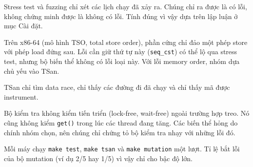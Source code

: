 \label{sec:corr:limits}

Stress test và fuzzing chỉ xét các lịch chạy đã xảy ra. Chúng chỉ ra được là có lỗi, không chứng minh
được là không có lỗi. Tính đúng vì vậy dựa trên lập luận ở mục Cài đặt.

Trên x86-64 (mô hình TSO, total store order), phần cứng chỉ đảo một phép store với phép load đứng sau.
Lỗi cần giữ thứ tự này (\texttt{seq\_cst}) có thể lộ qua stress test, nhưng bộ biến thể không có lỗi
loại này. Với lỗi memory order, nhóm dựa chủ yếu vào TSan.

TSan chỉ tìm data race, chỉ thấy các đường đi đã chạy và chỉ thấy mã được instrument.

Bộ kiểm tra không kiểm tiến triển (lock-free, wait-free) ngoài trường hợp treo. Nó cũng không kiểm
\texttt{get()} trong lúc các thread đang tăng. Các biến thể hỏng do chính nhóm chọn, nên chúng chỉ
chứng tỏ bộ kiểm tra nhạy với những lỗi đó.

Mỗi máy chạy \texttt{make test}, \texttt{make tsan} và \texttt{make mutation} một lượt. Tỉ lệ bắt
lỗi của bộ mutation (ví dụ 2/5 hay 1/5) vì vậy chỉ cho bậc độ lớn.
